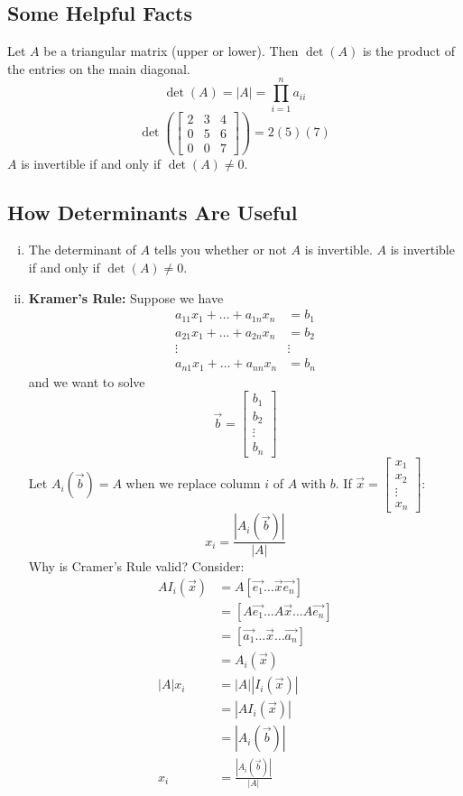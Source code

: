 \documentclass{math}
\begin{document}
\subsection*{Some Helpful Facts}
Let \( A \) be a triangular matrix (upper or lower). Then \( \det(A) \) is
the product of the entries on the main diagonal.
\[ \det(A) = |A| = \prod_{i=1}^{n}a_{ii} \]
\[ \det\left(\begin{bmatrix}2 & 3 & 4 \\ 0 & 5 & 6 \\ 0 & 0 & 7
  \end{bmatrix}\right) = 2(5)(7) \]
\( A \) is invertible if and only if \( \det(A) \ne 0 \).

\subsection*{How Determinants Are Useful}
\begin{enumerate}[(i)]
  \item The determinant of \( A \) tells you whether or not \( A \) is
  invertible. \( A \) is invertible if and only if \( \det(A) \ne 0 \).
  \item \textbf{Kramer's Rule:} Suppose we have
  \begin{align*}
    a_{11}x_1+\dots+a_{1n}x_n &= b_1 \\
    a_{21}x_1+\dots+a_{2n}x_n &= b_2 \\
    \vdots & \vdots \\
    a_{n1}x_1+\dots+a_{nn}x_n &= b_n
  \end{align*}
  and we want to solve
  \[ \vec{b} = \begin{bmatrix}b_1 \\ b_2 \\ \vdots \\ b_n\end{bmatrix} \]
  Let \( A_i(\vec{b}) = A \) when we replace column \( i \) of \( A \) with
  \( b \). If \( \vec{x} = \begin{bmatrix}x_1 \\ x_2 \\ \vdots \\ x_n
  \end{bmatrix} \):
  \[ x_i = \frac{|A_i(\vec{b})|}{|A|} \]
  Why is Cramer's Rule valid? Consider:
  \begin{align*}
    AI_i(\vec{x}) &= A[\vec{e_1}\dots\vec{x}\vec{e_n}] \\
    &= [A\vec{e_1}\dots A\vec{x}\dots A\vec{e_n}] \\
    &= [\vec{a_1}\dots\vec{x}\dots\vec{a_n}] \\
    &= A_i(\vec{x}) \\
    |A|x_i &= |A||I_i(\vec{x})| \\
    &= |AI_i(\vec{x})| \\
    &= |A_i(\vec{b})| \\
    x_i &= \frac{|A_i(\vec{b})|}{|A|}
  \end{align*}
\end{enumerate}
\end{document}

